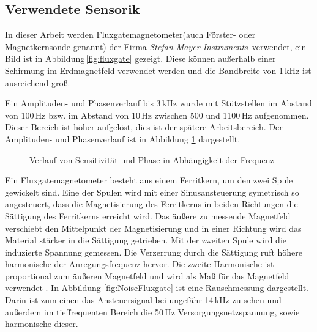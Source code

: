 \subsection{Verwendete Sensorik}
\label{subsec:Fluxgate}
In dieser Arbeit werden Fluxgatemagnetometer(auch Förster- oder Magnetkernsonde genannt) der Firma \textit{Stefan Mayer Instruments}\,\cite{noauthor_magnetfeldsensor_nodate} verwendet, ein Bild ist in Abbildung\,\ref{fig:fluxgate} gezeigt. Diese können außerhalb einer Schirmung im Erdmagnetfeld verwendet werden und die Bandbreite von 1\,kHz ist ausreichend groß.

Ein Amplituden- und Phasenverlauf bis 3\,kHz wurde mit Stützstellen im Abstand von 100\,Hz bzw. im Abstand von 10\,Hz zwischen 500 und 1100\,Hz aufgenommen. Dieser Bereich ist höher aufgelöst, dies ist der spätere Arbeitsbereich. Der Amplituden- und Phasenverlauf ist in Abbildung \ref{fig:FluxFreq} dargestellt.
    \begin{figure}[h]
        \centering
            \label{fig:Frequenzverlauf}
        \caption{Verlauf von Sensitivität und Phase in Abhängigkeit der Frequenz}
        \label{fig:FluxFreq}

    \end{figure}
Ein Fluxgatemagnetometer besteht aus einem Ferritkern, um den zwei Spule gewickelt sind. Eine der Spulen wird mit einer Sinusansteuerung symetrisch so angesteuert, dass die Magnetisierung des Ferritkerns in beiden Richtungen die Sättigung des Ferritkerns erreicht wird. Das äußere zu messende Magnetfeld verschiebt den Mittelpunkt der Magnetisierung und in einer Richtung wird das Material stärker in die Sättigung getrieben. Mit der zweiten Spule wird die induzierte Spannung gemessen. Die Verzerrung durch die Sättigung ruft höhere harmonische der Anregungsfrequenz hervor. Die zweite Harmonische ist proportional zum äußeren Magnetfeld und wird als Maß für das Magnetfeld verwendet \cite{michalowsky_magnettechnik_2006}. In Abbildung \ref{fig:NoiseFluxgate} ist eine Rauschmessung dargestellt. Darin ist zum einen das Ansteuersignal bei ungefähr 14\,kHz zu sehen und außerdem im tieffrequenten Bereich die 50\,Hz Versorgungsnetzspannung, sowie harmonische dieser.


